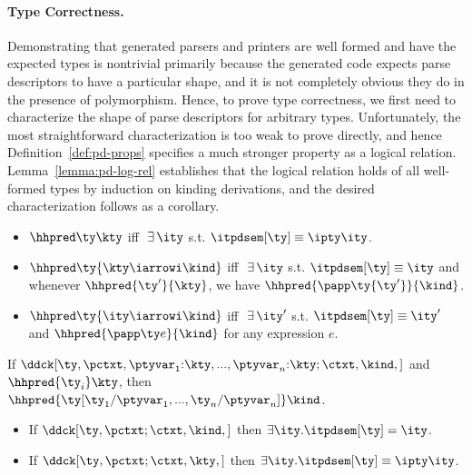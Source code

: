\paragraph*{Type Correctness.}
Demonstrating that generated parsers and printers are well formed
and have the expected types is nontrivial primarily because
the generated code expects parse descriptors to have a particular shape,
and it is not completely obvious they do in the presence of polymorphism.
Hence, to prove type correctness, we first need to characterize the shape of
parse descriptors for arbitrary \ddc{} types.   
Unfortunately, the most straightforward characterization is
too weak to prove directly, and hence Definition~\ref{def:pd-props}
specifies a much stronger property as a logical relation.
Lemma~\ref{lemma:pd-log-rel} establishes that the logical relation
holds of all well-formed \ddc{} types by induction on kinding
derivations, and the desired characterization follows as a corollary.

\begin{definition}
\label{def:pd-props}
\begin{itemize}
\item $\hhpred \ty \kty$ iff $\ \exists\,\ity$ s.t. $\itpdsem[\ty] \equiv
  {\ipty \ity}$.
\item $\hhpred \ty {\kty \iarrowi \kind}$ iff $\ \exists\,\ity$
  s.t. $\itpdsem[\ty] \equiv \ity$ and whenever $\hhpred
  {\ty'}{\kty}$, we have $\hhpred {\papp \ty {\ty'}}{\kind}$.
\item $\hhpred \ty {\ity \iarrowi \kind}$ iff $\ \exists\,\ity'$
  s.t. $\itpdsem[\ty] \equiv \ity'$ and $\hhpred{\papp \ty e}{\kind}$
  for any expression $e$.
\end{itemize}
\end{definition}
\begin{lemma}
\label{lemma:pd-log-rel}
   If
   $\ddck[\ty,{\pctxt,\ptyvar_1{:}\kty,...,\ptyvar_n{:}\kty;\ctxt},\kind,{}]$ 
   and $\hhpred {\ty_i} \kty$, then \\ 
   $\hhpred {\ty[\ty_1/\ptyvar_1,...,\ty_n/\ptyvar_n]} \kind$.
\end{lemma}

\begin{lemma}
\label{lemma:pd-props}
  \begin{itemize}
  \item If $\ddck[\ty,\pctxt;\ctxt,\kind,{}]$ then $\exists
     \ity.\itpdsem[\ty] = \ity$.
   \item If $\ddck[\ty,\pctxt;\ctxt,\kty,{}]$ then $\exists
     \ity.\itpdsem[\ty] \equiv \ipty \ity$.
  \end{itemize}
\end{lemma}


